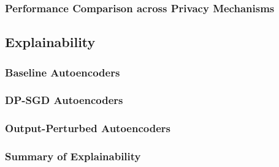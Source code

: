 \subsubsection{Performance Comparison across Privacy Mechanisms}
\iffalse\begin{itemize}
	\item Main performance table (Table II): Compare Accuracy, Precision, Recall, F1, AUC across all models.
	\item Visual comparison (bar chart or radar plot).
	\item Comment briefly but neutrally on the overall results.
\end{itemize}\fi

\subsection{Explainability}

\subsubsection{Baseline Autoencoders}

\subsubsection{DP-SGD Autoencoders}

\subsubsection{Output-Perturbed Autoencoders}

\subsubsection{Summary of Explainability}